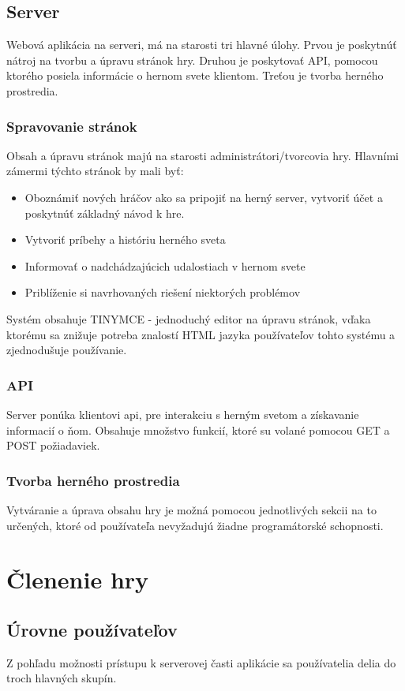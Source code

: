 \subsection{Server}
Webová aplikácia na serveri, má na starosti tri hlavné úlohy. Prvou je poskytnúť nátroj na tvorbu a úpravu stránok hry. Druhou je poskytovať API, pomocou ktorého posiela informácie o hernom svete klientom. Treťou je tvorba herného prostredia.\ 

\subsubsection{Spravovanie stránok}
Obsah a úpravu stránok majú na starosti administrátori/tvorcovia hry. Hlavními zámermi týchto stránok by mali byť:
 \begin{itemize}
  \item Oboznámiť nových hráčov ako sa pripojiť na herný server, vytvoriť účet a poskytnúť základný návod k hre.
  \item Vytvoriť príbehy a históriu herného sveta 
  \item Informovať o nadchádzajúcich udalostiach v hernom svete
  \item Priblíženie si navrhovaných riešení niektorých problémov
\end{itemize}
Systém obsahuje TINYMCE - jednoduchý editor na úpravu stránok, vďaka ktorému sa znižuje potreba znalostí HTML jazyka používateľov tohto systému a zjednodušuje používanie.

\subsubsection{API}
Server ponúka klientovi api, pre interakciu s herným svetom a získavanie informacií o ňom. Obsahuje množstvo funkcií, ktoré su volané pomocou GET a POST požiadaviek.

\subsubsection{Tvorba herného prostredia}
Vytváranie a úprava obsahu hry je možná pomocou jednotlivých sekcii na to určených, ktoré od používateľa nevyžadujú žiadne programátorské schopnosti. 


\section{Členenie hry}
\subsection{Úrovne používateľov}
Z pohľadu možnosti prístupu k serverovej časti aplikácie sa používatelia delia do troch hlavných skupín. 

